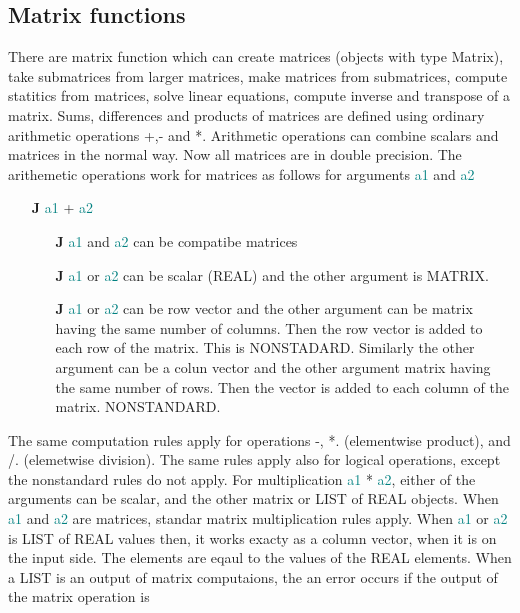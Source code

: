 \subsection{Matrix functions}
\label{matrixf}
There are matrix function which can create matrices (objects with type Matrix), take submatrices from larger matrices,
make matrices from submatrices, compute statitics from matrices, solve linear equations,
compute inverse and transpose of a matrix.
Sums, differences and products of matrices are defined using ordinary arithmetic
operations +,- and *. Arithmetic operations can combine scalars and matrices in the normal way.
Now all matrices are in double precision.
The arithemetic operations work for matrices as follows for arguments \textcolor{teal}{a1} and \textcolor{teal}{a2}
\begin{itemize}
\item[\textbf{J}] \textcolor{teal}{a1} + \textcolor{teal}{a2}
\begin{itemize}
\item[\textbf{J}] \textcolor{teal}{a1} and \textcolor{teal}{a2} can be compatibe matrices
\item[\textbf{J}] \textcolor{teal}{a1} or \textcolor{teal}{a2} can be scalar (REAL) and the other argument is MATRIX.
\item[\textbf{J}] \textcolor{teal}{a1} or \textcolor{teal}{a2} can be row vector and the other argument
can be matrix having the same number
of columns. Then the row vector is added to each row of the matrix. This is NONSTADARD.
Similarly the other argument can be a colun vector and the other argument matrix having the same number of rows.
Then the vector is added to each column of the matrix. NONSTANDARD.
\end{itemize}
\end{itemize}
The same computation rules apply for operations -, *. (elementwise product), and
/. (elemetwise division). The same rules apply also for logical operations,
except the nonstandard rules do not apply.
For multiplication \textcolor{teal}{a1} * \textcolor{teal}{a2}, either of the arguments can be scalar,
and the other matrix or LIST of REAL objects.
When \textcolor{teal}{a1} and \textcolor{teal}{a2} are matrices, standar matrix multiplication rules apply.
When \textcolor{teal}{a1} or \textcolor{teal}{a2} is LIST of REAL values then, it works exacty as
a column vector, when it is on the input side.  The elements are eqaul
to the values of the REAL elements. When a LIST is an output of matrix
computaions, the an error occurs if the output of the matrix operation is
